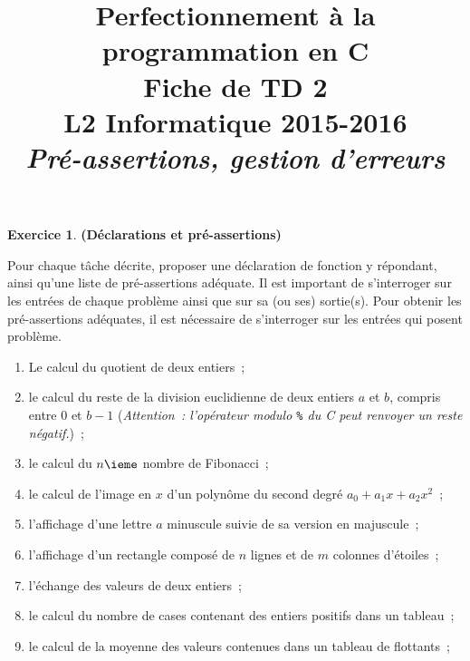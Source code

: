 \documentclass[12pt]{article}
\date{}
\title{{\bf Perfectionnement à la programmation en {\sf C}} \\
    Fiche de TD 2 \\
    {\small L2 Informatique 2015-2016} \\
    {\it \small Pré-assertions, gestion d'erreurs}}
\theoremstyle{definition}
\newtheorem{Exercice}{Exercice}
\begin{document}
\maketitle

\begin{Exercice} {\bf (Déclarations et pré-assertions)}\smallskip

Pour chaque tâche décrite, proposer une déclaration de fonction y
répondant, ainsi qu'une liste de pré-assertions adéquate. Il est 
important de s'interroger sur les entrées de chaque problème ainsi que 
sur sa (ou ses) sortie(s). Pour obtenir les pré-assertions adéquates, il 
est nécessaire de s'interroger sur les entrées qui posent problème.

\begin{enumerate}
    \item Le calcul du quotient de deux entiers~;
    \smallskip
    
    \item le calcul du reste de la division euclidienne de deux entiers 
    $a$ et $b$, compris entre $0$ et $b - 1$ ({\it Attention~: l'opérateur 
    modulo {\tt \%} du {\sf C} peut renvoyer un reste négatif.})~;
    \smallskip
    
    \item le calcul du $n\ieme$ nombre de Fibonacci~;
    \smallskip
    
    \item le calcul de l'image en $x$ d'un polynôme du second degré
    $a_0 + a_1 x + a_2 x^2$~;
    \smallskip
    
    \item l'affichage d'une lettre $a$ minuscule suivie de sa version 
    en majuscule~;
    \smallskip
    
    \item l'affichage d'un rectangle composé de $n$ lignes et de $m$
    colonnes d'étoiles~;
    \smallskip
    
    \item l'échange des valeurs de deux entiers~;
    \smallskip
    
    \item le calcul du nombre de cases contenant des entiers positifs 
    dans un tableau~;
    \smallskip
    
    \item le calcul de la moyenne des valeurs contenues dans un tableau 
    de flottants~;
    \smallskip
    

\end{enumerate}
\end{Exercice}
\end{document}
